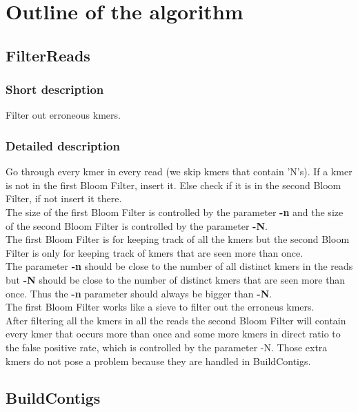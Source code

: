 \documentclass[a4paper]{report}
\renewcommand{\b}[1]{\textbf{#1}}  %
\begin{document}
\chapter{Outline of the algorithm}

\section{FilterReads}

\subsection{Short description}
Filter out erroneous kmers.

\subsection{Detailed description}
Go through every kmer in every read (we skip kmers that contain 'N's). If a kmer is not in the first Bloom Filter, insert it. Else check 
if it is in the second Bloom Filter, if not insert it there.\\[4pt]

The size of the first Bloom Filter is controlled by the parameter \b{-n} and the size of the second Bloom Filter
is controlled by the parameter \b{-N}.\\[4pt]

The first Bloom Filter is for keeping track of all the kmers but the second Bloom Filter
is only for keeping track of kmers that are seen more than once.\\[4pt]

The parameter \b{-n} should be close to the number of all distinct kmers in the reads but \b{-N} should be close to the
number of distinct kmers that are seen more than once. Thus the \b{-n} parameter should always be bigger than \b{-N}.\\[4pt]

The first Bloom Filter works like a sieve to filter out the erroneus kmers.\\[4pt]

After filtering all the kmers in all the reads the second Bloom Filter will contain every kmer that occurs more than once and some more kmers in direct ratio to the false positive rate, which is controlled by the parameter -N. Those extra kmers do not pose a problem because they are handled in BuildContigs.\\[4pt]

\newpage
\section{BuildContigs}
\end{document}
